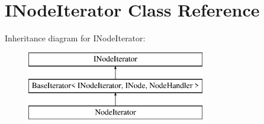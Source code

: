 \hypertarget{class_i_node_iterator}{}\section{I\+Node\+Iterator Class Reference}
\label{class_i_node_iterator}
Inheritance diagram for I\+Node\+Iterator\+:\begin{figure}[H]
\begin{center}
\leavevmode
\includegraphics[height=3.000000cm]{class_i_node_iterator}
\end{center}
\end{figure}
